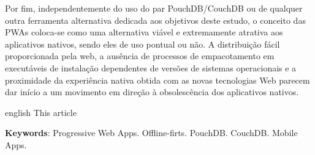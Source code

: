 \documentclass[
	article,			%
	11pt,				%
	oneside,			%
	a4paper,			%
	english,			%
	brazil,				%
	sumario=tradicional
	]{abntex2}
\begin{document}
Por fim, independentemente do uso do par PouchDB/CouchDB ou de qualquer outra ferramenta alternativa dedicada aos objetivos deste estudo, o conceito das PWAs coloca-se como uma alternativa viável e extremamente atrativa aos aplicativos nativos, sendo eles de uso pontual ou não. A distribuição fácil proporcionada pela web, a ausência de processos de empacotamento em executáveis de instalação dependentes de versões de sistemas operacionais e a proximidade da experiência nativa obtida com as novas tecnologias Web parecem dar início a um movimento em direção à obsolescência dos aplicativos nativos.

\postextual



\emptythanks
\maketitle

\renewcommand{\resumoname}{Abstract}
\begin{resumoumacoluna}
 \begin{otherlanguage*}{english}
   This article 

   \vspace{\onelineskip}
 
   \noindent
   \textbf{Keywords}: Progressive Web Apps. Offline-firts. PouchDB. CouchDB. Mobile Apps.
 \end{otherlanguage*}  
\end{resumoumacoluna}



\end{document}
